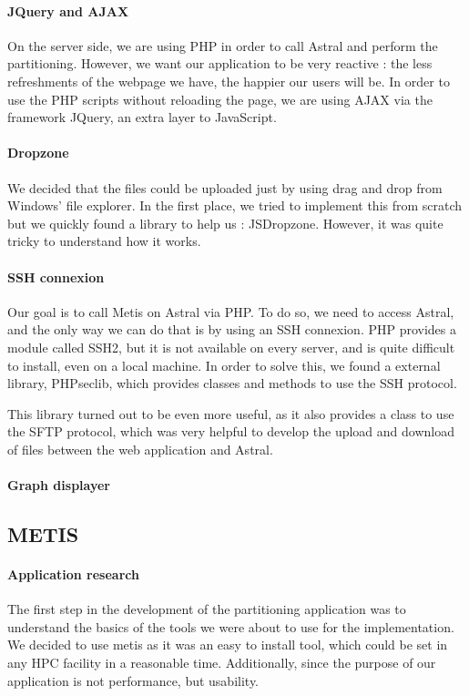 \documentclass{cranfieldChart}
\begin{document}
\paragraph{JQuery and AJAX}
On the server side, we are using PHP in order to call Astral and perform the partitioning. However, we want our application to be very reactive : the less refreshments of the webpage we have, the happier our users will be. In order to use the PHP scripts without reloading the page, we are using AJAX via the framework JQuery, an extra layer to JavaScript.

\paragraph{Dropzone}
We decided that the files could be uploaded just by using drag and drop from Windows' file explorer. In the first place, we tried to implement this from scratch but we quickly found a library to help us : JSDropzone. However, it was quite tricky to understand how it works.

\paragraph{SSH connexion}
Our goal is to call Metis on Astral via PHP. To do so, we need to access Astral, and the only way we can do that is by using an SSH connexion. PHP provides a module called SSH2, but it is not available on every server, and is quite difficult to install, even on a local machine. In order to solve this, we found a external library, PHPseclib, which provides classes and methods to use the SSH protocol.

This library turned out to be even more useful, as it also provides a class to use the SFTP protocol, which was very helpful to develop the upload and download of files between the web application and Astral.

\paragraph{Graph displayer}

\subsection{METIS}

\paragraph{Application research}
The first step in the development of the partitioning application was to understand the basics of the tools we were about to use for the implementation. We decided to use metis as it was an easy to install tool, which could be set in any HPC facility in a reasonable time. Additionally, since the purpose of our application is not performance, but usability.
\end{document}
